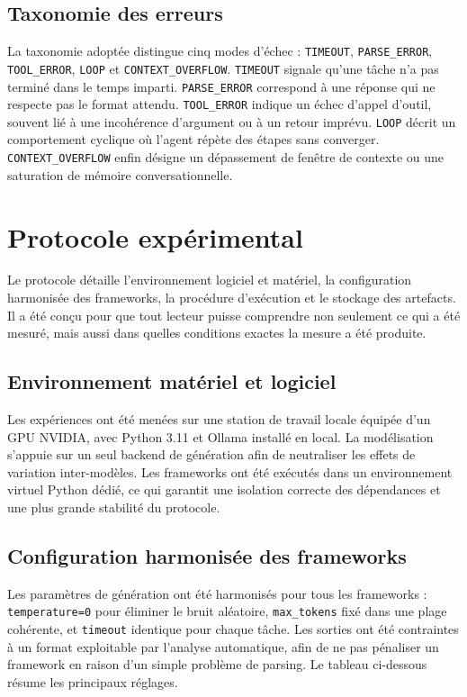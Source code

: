 \documentclass[11pt,a4paper]{article}
\begin{document}
\subsection{Taxonomie des erreurs}
La taxonomie adoptée distingue cinq modes d'échec : \texttt{TIMEOUT}, \texttt{PARSE\_ERROR}, \texttt{TOOL\_ERROR}, \texttt{LOOP} et \texttt{CONTEXT\_OVERFLOW}. \texttt{TIMEOUT} signale qu'une tâche n'a pas terminé dans le temps imparti. \texttt{PARSE\_ERROR} correspond à une réponse qui ne respecte pas le format attendu. \texttt{TOOL\_ERROR} indique un échec d'appel d'outil, souvent lié à une incohérence d'argument ou à un retour imprévu. \texttt{LOOP} décrit un comportement cyclique où l'agent répète des étapes sans converger. \texttt{CONTEXT\_OVERFLOW} enfin désigne un dépassement de fenêtre de contexte ou une saturation de mémoire conversationnelle.

\section{Protocole expérimental}
\label{sec:protocole}
Le protocole détaille l'environnement logiciel et matériel, la configuration harmonisée des frameworks, la procédure d'exécution et le stockage des artefacts. Il a été conçu pour que tout lecteur puisse comprendre non seulement ce qui a été mesuré, mais aussi dans quelles conditions exactes la mesure a été produite.

\subsection{Environnement matériel et logiciel}
Les expériences ont été menées sur une station de travail locale équipée d'un GPU NVIDIA, avec Python 3.11 et Ollama installé en local. La modélisation s'appuie sur un seul backend de génération afin de neutraliser les effets de variation inter-modèles. Les frameworks ont été exécutés dans un environnement virtuel Python dédié, ce qui garantit une isolation correcte des dépendances et une plus grande stabilité du protocole.

\subsection{Configuration harmonisée des frameworks}
Les paramètres de génération ont été harmonisés pour tous les frameworks : \texttt{temperature=0} pour éliminer le bruit aléatoire, \texttt{max\_tokens} fixé dans une plage cohérente, et \texttt{timeout} identique pour chaque tâche. Les sorties ont été contraintes à un format exploitable par l'analyse automatique, afin de ne pas pénaliser un framework en raison d'un simple problème de parsing. Le tableau ci-dessous résume les principaux réglages.
\end{document}
